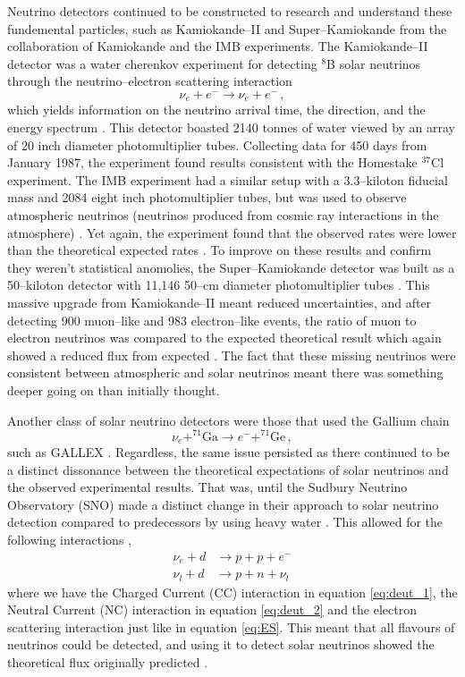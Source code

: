 Neutrino detectors continued to be constructed to research and understand these fundemental particles, such as Kamiokande--II \cite{kam,kamioka} and Super--Kamiokande \cite{superk} from the collaboration of Kamiokande \cite{kam} and the IMB \cite{imb} experiments. The Kamiokande--II detector was a water cherenkov experiment for detecting $^{8}$B solar neutrinos through the neutrino--electron scattering interaction
\begin{equation}\label{eq:ES}
  \nu_{e} + e^{-} \to \nu_{e} + e^{-}\, ,
\end{equation}
which yields information on the neutrino arrival time, the direction, and the energy spectrum \cite{kamioka}. This detector boasted 2140 tonnes of water viewed by an array of 20 inch diameter photomultiplier tubes. Collecting data for 450 days from January 1987, the experiment found results consistent with the Homestake $^{37}$Cl experiment. The IMB experiment had a similar setup with a 3.3--kiloton fiducial mass and 2084 eight inch photomultiplier tubes, but was used to observe atmospheric neutrinos (neutrinos produced from cosmic ray interactions in the atmosphere) \cite{imb}. Yet again, the experiment found that the observed rates were lower than the theoretical expected rates \cite{imb}. To improve on these results and confirm they weren't statistical anomolies, the Super--Kamiokande detector was built as a 50--kiloton detector with 11,146 50--cm diameter photomultiplier tubes \cite{kam}. This massive upgrade from Kamiokande--II meant reduced uncertainties, and after detecting 900 muon--like and 983 electron--like events, the ratio of muon to electron neutrinos was compared to the expected theoretical result which again showed a reduced flux from expected \cite{kam}. The fact that these missing neutrinos were consistent between atmospheric and solar neutrinos meant there was something deeper going on than initially thought.

Another class of solar neutrino detectors were those that used the Gallium chain
\begin{equation}\label{eq:gal}
  \nu_{e} + ^{71}\text{Ga} \to e^{-} + ^{71}\text{Ge}\, ,
\end{equation}
such as GALLEX \cite{gallex}. Regardless, the same issue persisted as there continued to be a distinct dissonance between the theoretical expectations of solar neutrinos and the observed experimental results. That was, until the Sudbury Neutrino Observatory (SNO) made a distinct change in their approach to solar neutrino detection compared to predecessors by using heavy water \cite{sno}. This allowed for the following interactions \cite{sno},
\begin{align}
  \nu_{e} + d & \to p + p + e^{-} \label{eq:deut_1} \\
  \nu_{l} + d & \to p + n + \nu_{l} \label{eq:deut_2}
\end{align}
where we have the Charged Current (CC) interaction in equation \ref{eq:deut_1}, the Neutral Current (NC) interaction in equation \ref{eq:deut_2} and the electron scattering interaction just like in equation \ref{eq:ES}. This meant that all flavours of neutrinos could be detected, and using it to detect solar neutrinos showed the theoretical flux originally predicted \cite{sno}.

